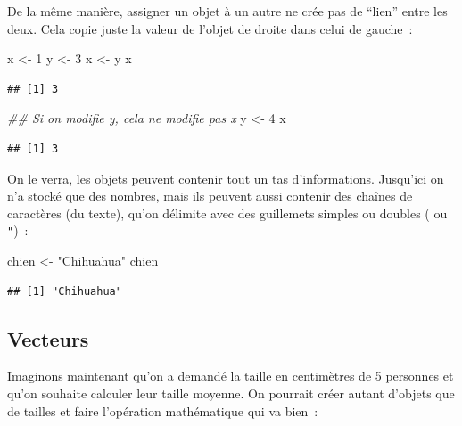 \documentclass[
  12pt,
]{book}
\newenvironment{Shaded}{\begin{snugshade}}{\end{snugshade}}
\newcommand{\CommentTok}[1]{\textcolor[rgb]{0.56,0.35,0.01}{\textit{#1}}}
\newcommand{\DecValTok}[1]{\textcolor[rgb]{0.00,0.00,0.81}{#1}}
\newcommand{\NormalTok}[1]{#1}
\newcommand{\StringTok}[1]{\textcolor[rgb]{0.31,0.60,0.02}{#1}}
\begin{document}
De la même manière, assigner un objet à un autre ne crée pas de ``lien'' entre les deux. Cela copie juste la valeur de l'objet de droite dans celui de gauche~:

\begin{Shaded}
\begin{Highlighting}[]
\NormalTok{x \textless{}{-}}\StringTok{ }\DecValTok{1}
\NormalTok{y \textless{}{-}}\StringTok{ }\DecValTok{3}
\NormalTok{x \textless{}{-}}\StringTok{ }\NormalTok{y}
\NormalTok{x}
\end{Highlighting}
\end{Shaded}

\begin{verbatim}
## [1] 3
\end{verbatim}

\begin{Shaded}
\begin{Highlighting}[]
\CommentTok{\#\# Si on modifie y, cela ne modifie pas x}
\NormalTok{y \textless{}{-}}\StringTok{ }\DecValTok{4}
\NormalTok{x}
\end{Highlighting}
\end{Shaded}

\begin{verbatim}
## [1] 3
\end{verbatim}

On le verra, les objets peuvent contenir tout un tas d'informations. Jusqu'ici on n'a stocké que des nombres, mais ils peuvent aussi contenir des chaînes de caractères (du texte), qu'on délimite avec des guillemets simples ou doubles (\texttt{\textquotesingle{}} ou \texttt{"})~:

\begin{Shaded}
\begin{Highlighting}[]
\NormalTok{chien \textless{}{-}}\StringTok{ "Chihuahua"}
\NormalTok{chien}
\end{Highlighting}
\end{Shaded}

\begin{verbatim}
## [1] "Chihuahua"
\end{verbatim}

\hypertarget{vecteurs}{%
\subsection{Vecteurs}\label{vecteurs}}

Imaginons maintenant qu'on a demandé la taille en centimètres de 5 personnes et qu'on souhaite calculer leur taille moyenne. On pourrait créer autant d'objets que de tailles et faire l'opération mathématique qui va bien~:
\end{document}
